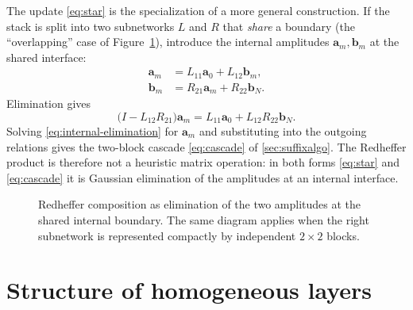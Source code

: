 \documentclass[11pt]{article}
\theoremstyle{remark}
\newcommand{\fa}{\mathbf{a}}
\newcommand{\fb}{\mathbf{b}}
\begin{document}
The update \eqref{eq:star} is the specialization of a more general
construction.  If the stack is split into two subnetworks $L$ and $R$ that
\emph{share} a boundary (the ``overlapping'' case of
Figure~\ref{fig:cascade}), introduce the internal amplitudes $\fa_m,\fb_m$ at
the shared interface:
\begin{align}
\fa_m&=L_{11}\fa_0+L_{12}\fb_m,\\
\fb_m&=R_{21}\fa_m+R_{22}\fb_N.
\end{align}
Elimination gives
\begin{equation}
\bigl(I-L_{12}R_{21}\bigr)\fa_m
=L_{11}\fa_0+L_{12}R_{22}\fb_N.
\label{eq:internal-elimination}
\end{equation}
Solving \eqref{eq:internal-elimination} for $\fa_m$ and substituting into the
outgoing relations gives the two-block cascade \eqref{eq:cascade} of
\cref{sec:suffixalgo}.  The Redheffer product is therefore not a heuristic
matrix operation: in both forms \eqref{eq:star} and \eqref{eq:cascade} it is
Gaussian elimination of the amplitudes at an internal interface.

\begin{figure}[t]
\centering
{}
\caption{Redheffer composition as elimination of the two amplitudes at the
shared internal boundary.  The same diagram applies when the right subnetwork
is represented compactly by independent $2\times2$ blocks.}
\label{fig:cascade}
\end{figure}

\section{Structure of homogeneous layers}
\label{sec:uniform}
\end{document}
